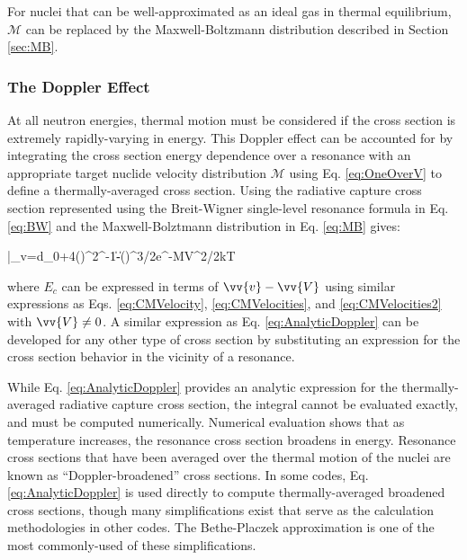 For nuclei that can be well-approximated as an ideal gas in thermal equilibrium, \(\mathscr{M}\) can be replaced by the Maxwell-Boltzmann distribution described in Section \ref{sec:MB}.

\subsubsection{The Doppler Effect}

At all neutron energies, thermal motion must be considered if the cross section is extremely rapidly-varying in energy. This Doppler effect can be accounted for by integrating the cross section energy dependence over a resonance with an appropriate target nuclide velocity distribution \(\mathscr{M}\) using Eq. \eqref{eq:OneOverV} to define a thermally-averaged cross section. Using the radiative capture cross section represented using the Breit-Wigner single-level resonance formula in Eq. \eqref{eq:BW} and the Maxwell-Bolztmann distribution in Eq. \eqref{eq:MB} gives:

\beq
\label{eq:AnalyticDoppler}
\bar{\sigma}_\gamma v=\int d\sigma_0\frac{\Gamma_\gamma}{\Gamma}\left{}+4\left(\right)^2\right\rbrack^{-1}\|-\|\left(\right)^{3/2}e^{-MV^2/2kT}
\eeq

where \(E_c\) can be expressed in terms of \(\vv{v}-\vv{V}\) using similar expressions as Eqs. \eqref{eq:CMVelocity}, \eqref{eq:CMVelocities}, and \eqref{eq:CMVelocities2} with \(\vv{V}\neq0\). A similar expression as Eq. \eqref{eq:AnalyticDoppler} can be developed for any other type of cross section by substituting an expression for the cross section behavior in the vicinity of a resonance. 

While Eq. \eqref{eq:AnalyticDoppler} provides an analytic expression for the thermally-averaged radiative capture cross section, the integral cannot be evaluated exactly, and must be computed numerically. Numerical evaluation shows that as temperature increases, the resonance cross section broadens in energy. Resonance cross sections that have been averaged over the thermal motion of the nuclei are known as ``Doppler-broadened'' cross sections. In some codes, Eq. \eqref{eq:AnalyticDoppler} is used directly to compute thermally-averaged broadened cross sections, though many simplifications exist that serve as the calculation methodologies in other codes. The Bethe-Placzek approximation is one of the most commonly-used of these simplifications. 

